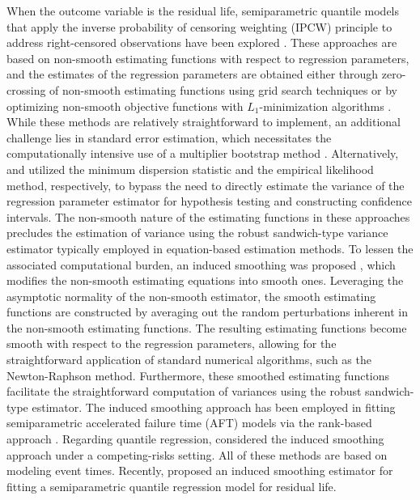 When the outcome variable is the residual life, 
semiparametric quantile models that apply the inverse probability of censoring weighting (IPCW) 
principle to address right-censored observations have been explored 
\citep{jung2009regression, kim2012censored, li2016quantile}.
These approaches are based on non-smooth estimating functions with respect to regression parameters, 
and the estimates of the regression parameters are obtained either through zero-crossing of 
non-smooth estimating functions using grid search techniques \citep{jung2009regression} or 
by optimizing non-smooth objective functions with $L_1$-minimization algorithms \citep{kim2012censored, li2016quantile}. 
While these methods are relatively straightforward to implement, 
an additional challenge lies in standard error estimation, 
which necessitates the computationally intensive use of a multiplier bootstrap method \citep{li2016quantile}.
Alternatively, \citet{jung2009regression} and \citet{kim2012censored} utilized the minimum dispersion statistic and 
the empirical likelihood method, respectively, 
to bypass the need to directly estimate the variance of the regression parameter estimator for 
hypothesis testing and constructing confidence intervals.
The non-smooth nature of the estimating functions in these approaches 
precludes the estimation of variance using the robust sandwich-type variance estimator typically employed 
in equation-based estimation methods. 
To lessen the associated computational burden, an induced smoothing was proposed \citep{brown2005standard}, 
which modifies the non-smooth estimating equations into smooth ones.
Leveraging the asymptotic normality of the non-smooth estimator, 
the smooth estimating functions are constructed by averaging out the random perturbations 
inherent in the non-smooth estimating functions.
The resulting estimating functions become smooth with respect to the regression parameters, 
allowing for the straightforward application of standard numerical algorithms, such as the Newton-Raphson method.
Furthermore, these smoothed estimating functions facilitate the straightforward computation of variances using 
the robust sandwich-type estimator.
The induced smoothing approach has been employed in fitting semiparametric accelerated failure time (AFT) models 
via the rank-based approach \citep{johnson2009induced, aftgeepackage, chiou2015semiparametric, Kang:fitt:2016}.
Regarding quantile regression, \citet{choi2018smoothed} considered the induced smoothing approach under 
a competing-risks setting. All of these methods are based on modeling event times.
Recently, \citet{kim2023smoothed} proposed an induced smoothing estimator for fitting 
a semiparametric quantile regression model for residual life.




